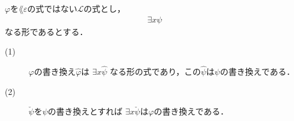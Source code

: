	\begin{screen}
		\begin{metathm}[部分式の書き換えとの関係3]
		\label{metathm:relation_to_subformula_rewriting_3}
			$\varphi$を$\lang{\varepsilon}$の式ではない$\mathcal{L}$の式とし，
			\begin{align}
				\exists x \psi
			\end{align}
			なる形であるとする．
			\begin{description}
				\item[(1)] $\varphi$の書き換え$\widehat{\varphi}$は
					$\exists x \widehat{\psi}$
					なる形の式であり，この$\widehat{\psi}$は$\psi$の書き換えである．
			
				\item[(2)] $\check{\psi}$を$\psi$の書き換えとすれば
					$\exists x \check{\psi}$は$\varphi$の書き換えである．
			\end{description}
		\end{metathm}
	\end{screen}
	
